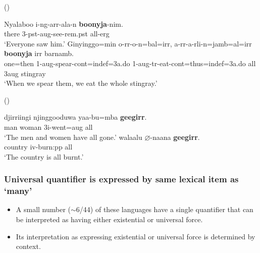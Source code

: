 \documentclass{article}
\begin{document}
\begin{exe}
   (\citealt[272]{bowern12})
  \begin{xlist}
    \ex \gll Nyalaboo i-ng-arr-ala-n \textbf{boonyja}-nim.\\
    there 3-{\sc pst}-{\sc aug}-see-{\sc rem.pst} all-{\sc erg}\\
    \glt `Everyone saw him.' \label{univ1}%
    \ex \gll Ginyinggo=min o-rr-o-n=bal=irr, a-rr-a-rli-n=jamb=al=irr \textbf{boonyja} irr barnamb.\\
    one={\sc then} 1-{\sc aug}-spear-{\sc cont}={\sc indef}=3{\sc a.do} 1-{\sc aug}-{\sc tr}-eat-{\sc cont}={\sc thus}={\sc indef}=3{\sc a.do} all 3{\sc aug} stingray\\
    \glt `When we spear them, we eat the whole stingray.' \label{univ2} %
  \end{xlist}
   (\citealt[307]{harvey92})
  \begin{xlist}
    \ex \gll djirriingi njinggooduwa yaa-bu=mba \textbf{geegirr}.\\
    man woman 3{\sc i}-went={\sc aug} all\\
    \glt `The men and women have all gone.'
    \ex \gll walaalu $\varnothing$-naana \textbf{geegirr}.\\
    country {\sc iv}-burn:{\sc pp} all\\
    \glt `The country is all burnt.'
  \end{xlist}
\end{exe}


\subsubsection{Universal quantifier is expressed by same lexical item as `many'}

\begin{itemize}
\item A small number  ($\sim$6/44) of these languages have a single quantifier that can be interpreted as having either existential or universal force.
\item Its interpretation as expressing existential or universal force is determined by context.
\end{itemize}

\newpage
\end{document}
